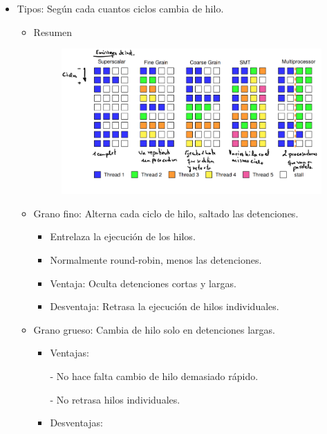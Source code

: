 \documentclass[12pt, twoside, openright]{report} %
\begin{document}
\begin{itemize}
\begin{itemize}
            \item
            Tipos: Según cada cuantos ciclos cambia de hilo. 
            \begin{itemize}
              \item Resumen
              \begin{figure}[H]
                {\includegraphics[scale=.3]{Untitled 12.png}}
              \end{figure}
              \item Grano fino: Alterna cada ciclo de hilo, saltado las detenciones.
              \begin{itemize}
                \item Entrelaza la ejecución de los hilos.
                \item Normalmente round-robin, menos las detenciones.
                \item Ventaja: Oculta detenciones cortas y largas.
                \item Desventaja: Retrasa la ejecución de hilos individuales.
              \end{itemize}
                  
              \item Grano grueso: Cambia de hilo solo en detenciones largas.
              \begin{itemize}
                \item Ventajas:
                
                - No hace falta cambio de hilo demasiado rápido.

                - No retrasa hilos individuales.
                \item Desventajas:
                

\end{itemize}
\end{itemize}
\end{itemize}
\end{itemize}
\end{document}
